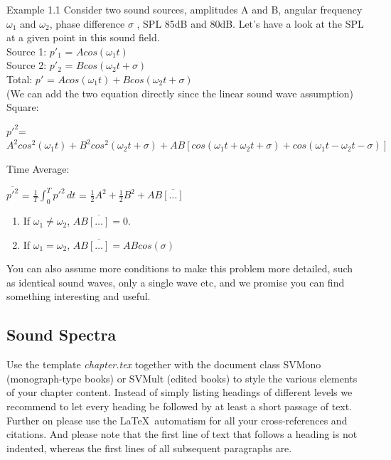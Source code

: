 \documentclass[graybox]{svmult}
\begin{document}
\begin{legaltext}{Example 1.1}
\indent 
Consider two sound sources, amplitudes A and B, angular frequency $\omega_1 $ and $\omega_2 $, phase difference $ \sigma $ , SPL 85dB and 80dB. Let's have a look at the SPL at a given point in this sound field. \\

\noindent 
Source 1: $ p'_1 $ = $ Acos(\omega_1t) $ \\
Source 2: $ p'_2 $ = $ Bcos(\omega_2t + \sigma) $ \\
Total: $ p' $ = $ Acos(\omega_1t) + Bcos(\omega_2t + \sigma) $ \\
(We can add the two equation directly since the  linear sound wave assumption) \\

\noindent 
Square:
\begin{center}
$ p'^2 $=$ A^2cos^2(\omega_1t) + B^2cos^2(\omega_2t + \sigma) +AB[cos(\omega_1t+\omega_2t+\sigma) + cos(\omega_1t-\omega_2t-\sigma)] $ \\
\end{center}
Time Average: 
\begin{center}
$ \overline{p'^2} $ = $ \frac{1}{T} \int_{0}^{T}  p'^2\,dt $ = $ \frac{1}{2}A^2 + \frac{1}{2}B^2 + AB\overline{[\dots]}$
\end{center}

\begin{enumerate}
    \item If $ \omega_1 \neq \omega_2 $, $ AB\overline{[\dots]} = 0 $.
    \item If $ \omega_1 = \omega_2 $, $ AB\overline{[\dots]} = ABcos(\sigma) $
\end{enumerate}

You can also assume more conditions to make this problem more detailed, such as identical sound waves, only a single wave etc, and we promise you can find something interesting and useful.
\end{legaltext}

\label{sec:1}
\subsection{Sound Spectra}
\label{subsec:2}



Use the template \emph{chapter.tex} together with the document class SVMono (monograph-type books) or SVMult (edited books) to style the various elements of your chapter content.
Instead of simply listing headings of different levels we recommend to let every heading be followed by at least a short passage of text.  Further on please use the \LaTeX\ automatism for all your cross-references and citations. And please note that the first line of text that follows a heading is not indented, whereas the first lines of all subsequent paragraphs are.
\end{document}
